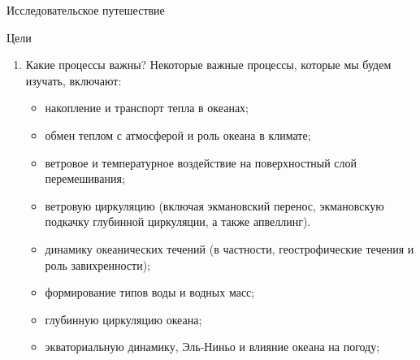\begin{chapter}{Исследовательское путешествие}
\begin{section}{Цели}
\begin{enumerate}
\item
Какие процессы важны? Некоторые важные процессы, которые мы будем изучать, 
включают:
%
\begin{itemize}
  \item
  накопление и транспорт тепла в океанах;
%

  \item
  обмен теплом с атмосферой и роль океана в климате; 
%

  \item
  ветровое и температурное воздействие на поверхностный слой перемешивания; 
%

  \item
  ветровую циркуляцию (включая экмановский перенос, экмановскую подкачку
  глубинной циркуляции, а также апвеллинг). 
%

  \item
  динамику океанических течений (в частности, геострофические течения и роль 
  завихренности); 
%

  \item
  формирование типов воды и водных масс;
%

  \item
  глубинную циркуляцию океана; 
%

  \item
  экваториальную динамику, Эль-Ниньо и влияние океана на погоду; 
%


\end{itemize}
\end{enumerate}
\end{section}
\end{chapter}
